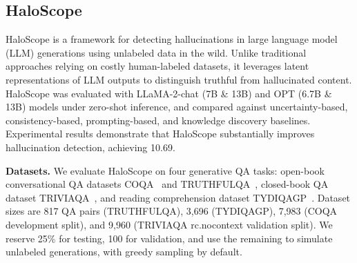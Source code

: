 \subsection{HaloScope}

HaloScope is a framework for detecting hallucinations in large language model (LLM) generations using unlabeled data in the wild. Unlike traditional approaches relying on costly human-labeled datasets, it leverages latent representations of LLM outputs to distinguish truthful from hallucinated content. HaloScope was evaluated with LLaMA-2-chat (7B \& 13B) and OPT (6.7B \& 13B) models under zero-shot inference, and compared against uncertainty-based, consistency-based, prompting-based, and knowledge discovery baselines. Experimental results demonstrate that HaloScope substantially improves hallucination detection, achieving 10.69.

\textbf{Datasets.} We evaluate HaloScope on four generative QA tasks: open-book conversational QA datasets COQA~\cite{37} and TRUTHFULQA~\cite{29}, closed-book QA dataset TRIVIAQA~\cite{20}, and reading comprehension dataset TYDIQAGP~\cite{9}. Dataset sizes are 817 QA pairs (TRUTHFULQA), 3,696 (TYDIQAGP), 7,983 (COQA development split), and 9,960 (TRIVIAQA rc.nocontext validation split). We reserve 25\% for testing, 100 for validation, and use the remaining to simulate unlabeled generations, with greedy sampling by default.


